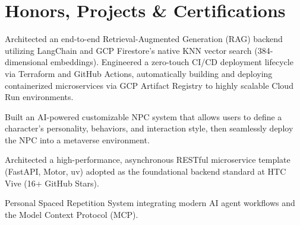 \section{Honors, Projects \& Certifications}
\begin{resumeitems}
  \item Architected an end-to-end Retrieval-Augmented Generation (RAG) backend utilizing LangChain and GCP Firestore's native KNN vector search (384-dimensional embeddings). Engineered a zero-touch CI/CD deployment lifecycle via Terraform and GitHub Actions, automatically building and deploying containerized microservices via GCP Artifact Registry to highly scalable Cloud Run environments.
\end{resumeitems}
\begin{resumeitems}
  \item Built an AI-powered customizable NPC system that allows users to define a character's personality, behaviors, and interaction style, then seamlessly deploy the NPC into a metaverse environment.
\end{resumeitems}
\begin{resumeitems}
  \item Architected a high-performance, asynchronous RESTful microservice template (FastAPI, Motor, uv) adopted as the foundational backend standard at HTC Vive (16+ GitHub Stars).
\end{resumeitems}
\begin{resumeitems}
  \item Personal Spaced Repetition System integrating modern AI agent workflows and the Model Context Protocol (MCP).
\end{resumeitems}
